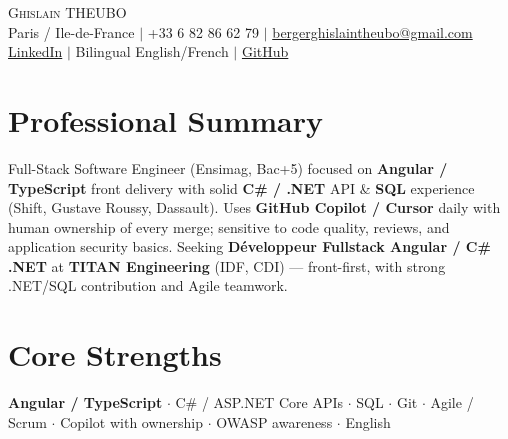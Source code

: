\documentclass[letterpaper,10.5pt]{article}
\begin{document}
\begin{center}
{\Huge \scshape Ghislain THEUBO} \\ \vspace{2pt}
\small Paris / Ile-de-France $|$ +33 6 82 86 62 79 $|$ \href{mailto:bergerghislaintheubo@gmail.com}{bergerghislaintheubo@gmail.com} \\
\href{https://www.linkedin.com/in/berger-ghislain}{LinkedIn} $|$ Bilingual English/French $|$ \href{https://github.com/Bergerghislain}{GitHub}
\end{center}
\vspace{-6pt}
\section{Professional Summary}
\small{Full-Stack Software Engineer (Ensimag, Bac+5) focused on \textbf{Angular / TypeScript} front delivery with solid \textbf{C\# / .NET} API \& \textbf{SQL} experience (Shift, Gustave Roussy, Dassault). Uses \textbf{GitHub Copilot / Cursor} daily with human ownership of every merge; sensitive to code quality, reviews, and application security basics. Seeking \textbf{D\'eveloppeur Fullstack Angular / C\# .NET} at \textbf{TITAN Engineering} (IDF, CDI) --- front-first, with strong .NET/SQL contribution and Agile teamwork.}
\section{Core Strengths}
\small{\textbf{Angular / TypeScript} $\cdot$ C\# / ASP.NET Core APIs $\cdot$ SQL $\cdot$ Git $\cdot$ Agile / Scrum $\cdot$ Copilot with ownership $\cdot$ OWASP awareness $\cdot$ English}
\end{document}
